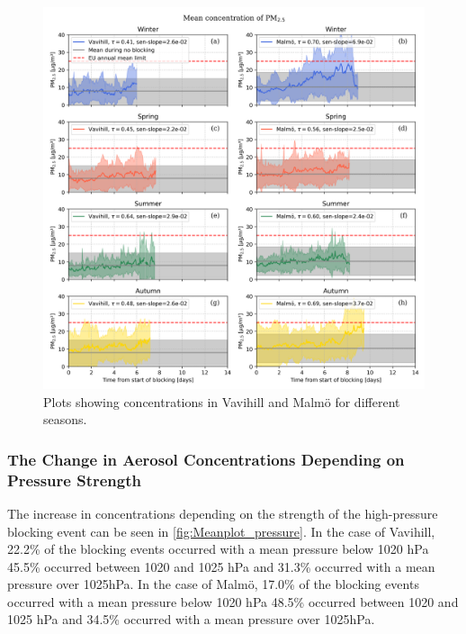 \begin{figure}[H]
    \centering
    \includegraphics[width=\textwidth]{Figures/Meanplot_seasonal.png}
    \caption{Plots showing \PM concentrations in Vavihill and Malmö for different seasons. }
    \label{fig:Meanplot_seasonal}
\end{figure}
 
\subsubsection{The Change in Aerosol Concentrations Depending on Pressure Strength}
The increase in \PM  concentrations depending on the strength of the high-pressure blocking event can be seen in \autoref{fig:Meanplot_pressure}. In the case of Vavihill, 22.2\% of the blocking events occurred with a mean pressure below 1020 hPa 45.5\% occurred between 1020 and 1025 hPa and 31.3\% occurred with a mean pressure over 1025hPa. In the case of Malmö, 17.0\% of the blocking events occurred with a mean pressure below 1020 hPa 48.5\% occurred between 1020 and 1025 hPa and 34.5\% occurred with a mean pressure over 1025hPa.


